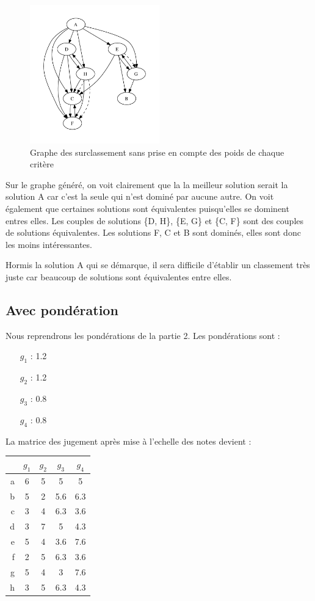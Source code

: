 \begin{figure}[!h]
\begin{center}
\includegraphics[width=0.5\textwidth]{../SourcesMatlab/electre3-1.pdf}
\caption{Graphe des surclassement sans prise en compte des poids de chaque critère}
\end{center}
\end{figure}

Sur le graphe généré, on voit clairement que la la meilleur solution serait la
solution A car c'est la seule qui n'est dominé par aucune autre.
On voit également que certaines solutions sont équivalentes puisqu'elles se
dominent entres elles. Les couples de solutions \{D, H\}, \{E, G\} et \{C, F\}
sont des couples de solutions équivalentes.
Les solutions F, C et B sont dominés, elles sont donc les moins intéressantes.

Hormis la solution A qui se démarque, il sera difficile d'établir un classement très juste car beaucoup de solutions sont équivalentes entre elles.

\subsection{Avec pondération}

Nous reprendrons les pondérations de la partie 2.
Les pondérations sont :
\begin{itemize}
\item[$g_1$] : 1.2
\item[$g_2$] : 1.2
\item[$g_3$] : 0.8
\item[$g_4$] : 0.8
\end{itemize}

La matrice des jugement après mise à l'echelle des notes devient :

\begin{tabular}{r | c c c c}
~ & $g_1$ & $g_2$ & $g_3$ & $g_4$ \\ \hline
a & 6 & 5 & 5   & 5   \\
b & 5 & 2 & 5.6 & 6.3 \\
c & 3 & 4 & 6.3 & 3.6 \\
d & 3 & 7 & 5   & 4.3 \\
e & 5 & 4 & 3.6 & 7.6 \\
f & 2 & 5 & 6.3 & 3.6 \\
g & 5 & 4 & 3   & 7.6 \\
h & 3 & 5 & 6.3 & 4.3 \\
\end{tabular}

